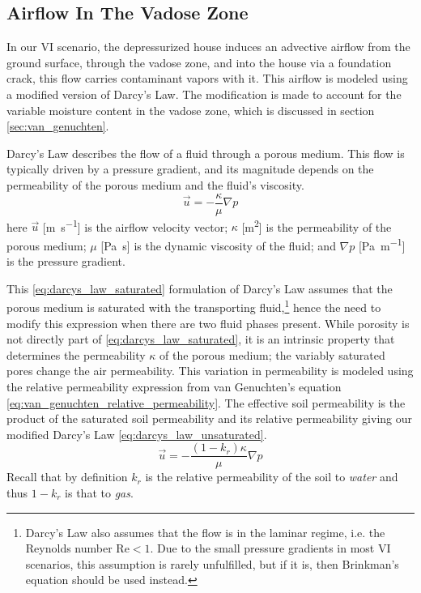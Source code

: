 \subsection{Airflow In The Vadose Zone}\label{sec:darcys_law}

In our VI scenario, the depressurized house induces an advective airflow from the ground surface, through the vadose zone, and into the house via a foundation crack, this flow carries contaminant vapors with it.
This airflow is modeled using a modified version of Darcy's Law.
The modification is made to account for the variable moisture content in the vadose zone, which is discussed in section \ref{sec:van_genuchten}.\par

Darcy's Law describes the flow of a fluid through a porous medium.
This flow is typically driven by a pressure gradient, and its magnitude depends on the permeability of the porous medium and the fluid's viscosity.
\begin{equation}\label{eq:darcys_law_saturated}
  \vec{u} = -\frac{\kappa}{\mu} \nabla p
\end{equation}
here $\vec{u}$ [\si{\m\per\second}] is the airflow velocity vector;
$\kappa$ [\si{\metre\squared}] is the permeability of the porous medium;
$\mu$ [\si{\pascal\second}] is the dynamic viscosity of the fluid;
and $\nabla p$ [\si{\pascal\per\metre}] is the pressure gradient.\par

This \eqref{eq:darcys_law_saturated} formulation of Darcy's Law assumes that the porous medium is saturated with the transporting fluid,\footnote{Darcy's Law also assumes that the flow is in the laminar regime, i.e. the Reynolds number $\mathrm{Re} < 1$.
Due to the small pressure gradients in most VI scenarios, this assumption is rarely unfulfilled, but if it is, then Brinkman's equation should be used instead.} %
hence the need to modify this expression when there are two fluid phases present.
While porosity is not directly part of \eqref{eq:darcys_law_saturated}, it is an intrinsic property that determines the permeability $\kappa$ of the porous medium; the variably saturated pores change the air permeability.
This variation in permeability is modeled using the relative permeability expression from van Genuchten's equation \eqref{eq:van_genuchten_relative_permeability}.
The effective soil permeability is the product of the saturated soil permeability and its relative permeability giving our modified Darcy's Law \eqref{eq:darcys_law_unsaturated}.
\begin{equation}\label{eq:darcys_law_unsaturated}
  \vec{u} = -\frac{(1-k_r)\kappa}{\mu} \nabla p
\end{equation}
Recall that by definition $k_r$ is the relative permeability of the soil to \textit{water} and thus $1-k_r$ is that to \textit{gas}.\par

